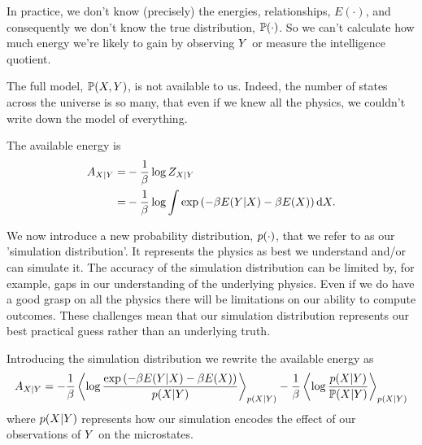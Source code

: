 \documentclass[]{article}
\begin{document}
In practice, we don't know (precisely) the energies, relationships,
\(E(\cdot)\), and consequently we don't know the true distribution,
\(\mathbb{P}(\cdot)\). So we can't calculate how much energy we're likely
to gain by observing \(Y\) or measure the intelligence quotient.

The full model, \(\mathbb{P}(X, Y)\), is not
available to us. Indeed, the number of states across the universe is so
many, that even if we knew all the physics, we couldn't write down the
model of everything.

The available energy is 
\begin{align*}
A_{X|Y} = & -\frac{1}{\beta} \log Z_{X|Y} \\
= & -\frac{1}{\beta} \log \int \exp\left(-\beta E(Y|X) -\beta E(X)\right) \text{d}X.
\end{align*}

We now introduce a new probability distribution,  \(p(\cdot)\), that we refer to as our 'simulation distribution'. It represents the physics as best we understand and/or can simulate it. The accuracy of the simulation distribution can be limited by, for example, gaps in our understanding of the underlying physics. Even if we do have a good grasp on all the physics there will be limitations on our ability to compute outcomes. These challenges mean that our simulation distribution represents our best practical guess rather than an underlying truth.

Introducing the simulation distribution we rewrite the available energy as
\[
A_{X|Y} =  -\frac{1}{\beta}\left\langle \log \frac{\exp\left(-\beta E(Y|X) -\beta E(X)\right)}{p(X|Y) } \right\rangle_{p(X|Y) } - \frac{1}{\beta}\left\langle \log \frac{p(X|Y)}{\mathbb{P}(X|Y) } \right\rangle_{p(X|Y) }
\] 
where \(p(X|Y)\) represents how our simulation encodes the effect of our  observations of \(Y\) on the microstates.
\end{document}
